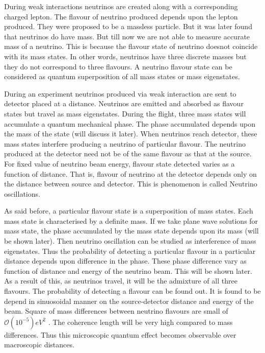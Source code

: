 \documentclass[12pt,a4paper]{report}
\begin{document}
During weak interactions neutrinos are created along with a corresponding charged lepton. The flavour of neutrino produced depends upon the lepton produced. They were proposed to be a massless particle.  But it was later found that neutrinos do have mass. But till now we are not able to measure accurate mass of a neutrino. This is because the flavour state of neutrino doesnot coincide with its mass states. In other words, neutrinos have three discrete masses but they do not correspond to three flavours. A neutrino flavour state can be considered as quantum superposition of all mass states or mass eigenstates. \par

During an experiment neutrinos produced via weak interaction are sent to detector placed at a distance. Neutrinos are emitted and absorbed as flavour states but travel as mass eigenstates. During the flight, three mass states will accumulate a quantum mechanical phase. The phase accumulated depends upon the mass of the state (will discuss it later). When neutrinos reach detector, these mass states interfere producing a neutrino of particular flavour. The neutrino produced at the detector need not be of the same flavour as that at the source. For fixed value of neutrino beam energy, flavour state detected varies as a function of distance. That is, flavour of neutrino at the detector depends only on the distance between source and detector. This is phenomenon is called Neutrino oscillations.\par

As said before, a particular flavour state is a superposition of mass states. Each mass state is characterised by a definite mass. If we take plane wave solutions for mass state, the phase accumulated by the mass state depends upon its mass (will be shown later). Then neutrino oscillation can be studied as interference of mass eigenstates. Thus the probability of detecting a particular flavour in a particular distance depends upon difference in the phase. These phase difference vary as function of distance and energy of the neutrino beam. This will be shown later. As a result of this, as neutrinos travel, it will be the admixture of all three flavours. The probability of detecting a flavour can be found out. It is found to be depend in sinuosoidal manner on the source-detector distance and energy of the beam. Square of mass differences between neutrino flavours are small of $\mathcal{O}({10^{-5}})eV^{2}$ . The coherence length will be very high compared to mass differences. Thus this microscopic quantum effect becomes observable over macroscopic distances.\par
\end{document}
